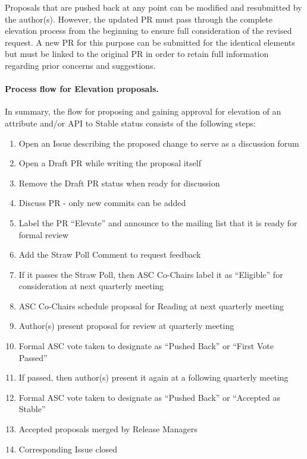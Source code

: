 \documentclass{article}
\providecommand{\tightlist}{%
  \setlength{\itemsep}{0pt}\setlength{\parskip}{0pt}}
\begin{document}
Proposals that are pushed back at any point can be modified and
resubmitted by the author(s). However, the updated PR must pass through
the complete elevation process from the beginning to ensure full
consideration of the revised request. A new PR for this purpose can be
submitted for the identical elements but must be linked to the original
PR in order to retain full information regarding prior concerns and
suggestions.

\hypertarget{process-flow-for-elevation-proposals}{%
\paragraph{Process flow for Elevation
proposals.}\label{process-flow-for-elevation-proposals}}

In summary, the flow for proposing and gaining approval for elevation of
an attribute and/or API to Stable status consists of the following
steps:

\begin{enumerate}
\def\labelenumi{\arabic{enumi}.}
\tightlist
\item
  Open an Issue describing the proposed change to serve as a discussion
  forum
\item
  Open a Draft PR while writing the proposal itself
\item
  Remove the Draft PR status when ready for discussion
\item
  Discuss PR - only new commits can be added
\item
  Label the PR ``Elevate'' and announce to the mailing list that it is
  ready for formal review
\item
  Add the Straw Poll Comment to request feedback
\item
  If it passes the Straw Poll, then ASC Co-Chairs label it as
  ``Eligible'' for consideration at next quarterly meeting
\item
  ASC Co-Chairs schedule proposal for Reading at next quarterly
  meeting
\item
  Author(s) present proposal for review at quarterly meeting
\item
  Formal ASC vote taken to designate as ``Pushed Back'' or ``First Vote
  Passed''
\item
  If passed, then author(s) present it again at a following quarterly
  meeting
\item
  Formal ASC vote taken to designate as ``Pushed Back'' or ``Accepted as
  Stable''
\item
  Accepted proposals merged by Release Managers
\item
  Corresponding Issue closed
\end{enumerate}
\end{document}
